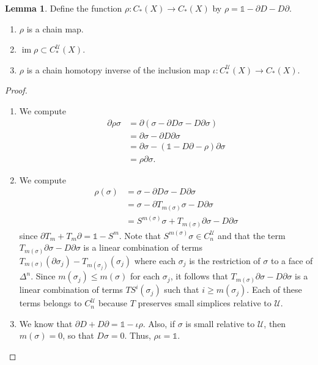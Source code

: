 \documentclass[10pt,letterpaper,cm]{nupset}
\theoremstyle{definition}
\theoremstyle{theorem}
\newtheorem{lemma}[definition]{Lemma}
\theoremstyle{remark}
\newcommand{\U}{\mathcal U}
\newcommand{\1}{\mathbb{1}}
\newcommand{\0}{\vec 0}
\DeclareMathOperator{\im}{im}
\begin{document}
\begin{lemma} Define the function $\rho : C_{\ast}(X) \to C_{\ast}(X)$ by $\rho = \1 - \partial{D} - D{\partial}$.
\begin{enumerate}
\item $\rho$ is a chain map.
\item $\im{\rho}\subset C_{\ast}^{\U}(X)$. 
\item $\rho$ is a chain homotopy inverse of the inclusion map $\iota : C_{\ast}^{\U}(X) \to C_{\ast}(X)$.
\end{enumerate}
\end{lemma}
\begin{proof} $ $
\begin{enumerate}
\item We compute
\begin{align*}
\partial{\rho{\sigma}} & = \partial(\sigma - \partial{D}{\sigma} - D{\partial}{\sigma})
\\ & = \partial{\sigma} - \partial{D{\partial{\sigma}}}
\\ & = \partial{\sigma} -(\1 -D{\partial} -\rho){\partial{\sigma}}
\\ & = \rho{\partial{\sigma}}.
\end{align*}
\item We compute 
\begin{align*}
\rho(\sigma) & = \sigma - \partial{D}{\sigma} - D{\partial}{\sigma}
\\ & = \sigma - \partial{T_{m(\sigma)}}{\sigma} - D{\partial}{\sigma}
\\ & = S^{m(\sigma)}{\sigma}+T_{m(\sigma)}{\partial{\sigma}} - D{\partial{\sigma}}
\end{align*} since $\partial{T_m} +T_m{\partial} = \1 -S^m$.
Note that $ S^{m(\sigma)}{\sigma} \in C_n^{\U}$ and that the term $T_{m(\sigma)}{\partial{\sigma}} - D{\partial{\sigma}}$ is a linear combination of terms $T_{m(\sigma)}(\partial{\sigma_j}) -T_{m(\sigma_j)}(\sigma_j)$ where each $\sigma_j$  is the restriction of $\sigma$ to a face of $\Delta^n$. Since $m(\sigma_j)\leq m(\sigma)$ for each $\sigma_j$, it follows that $T_{m(\sigma)}{\partial{\sigma}} - D{\partial{\sigma}}$ is a linear combination of terms $TS^i(\sigma_j)$ such that $i\geq m(\sigma_j)$. Each of these terms belongs to $C_n^{\U}$ because $T$ preserves small simplices relative to $\U$.
\item We know that $\partial{D} + D{\partial} =\1 - \iota{\rho}$. Also, if $\sigma$ is small relative to $\U$, then $m(\sigma) =0$, so that $D{\sigma} = 0$. Thus, $\rho{\iota} = \1$.
\end{enumerate}
\end{proof}
\end{document}
